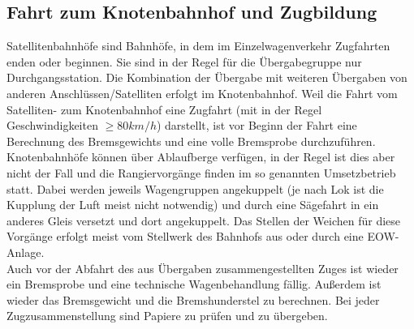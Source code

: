 \subsection{Fahrt zum Knotenbahnhof und Zugbildung}
Satellitenbahnhöfe sind Bahnhöfe, in dem im Einzelwagenverkehr Zugfahrten enden oder beginnen. Sie sind in der Regel für die Übergabegruppe nur Durchgangsstation. Die Kombination der Übergabe mit weiteren Übergaben von anderen Anschlüssen/Satelliten erfolgt im Knotenbahnhof. Weil die Fahrt vom Satelliten- zum Knotenbahnhof eine Zugfahrt (mit in der Regel Geschwindigkeiten $\ge 80 km/h$) darstellt, ist vor Beginn der Fahrt eine Berechnung des Bremsgewichts und eine volle Bremsprobe durchzuführen.\\
Knotenbahnhöfe können über Ablaufberge verfügen, in der Regel ist dies aber nicht der Fall und die Rangiervorgänge finden im so genannten Umsetzbetrieb statt. Dabei werden jeweils Wagengruppen angekuppelt (je nach Lok ist die Kupplung der Luft meist nicht notwendig) und durch eine Sägefahrt in ein anderes Gleis versetzt und dort angekuppelt. Das Stellen der Weichen für diese Vorgänge erfolgt meist vom Stellwerk des Bahnhofs aus oder durch eine EOW-Anlage.\\
Auch vor der Abfahrt des aus Übergaben zusammengestellten Zuges ist wieder ein Bremsprobe und eine technische Wagenbehandlung fällig. Außerdem ist wieder das Bremsgewicht und die Bremshunderstel zu berechnen. Bei jeder Zugzusammenstellung sind Papiere zu prüfen und zu übergeben.

